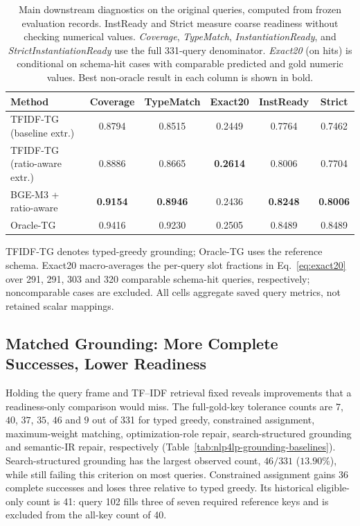 \documentclass[pdflatex,sn-basic,Numbered]{sn-jnl}
\begin{document}
\begin{table}[t]
  \centering
  \caption{Main downstream diagnostics on the original queries, computed from frozen evaluation records. InstReady and Strict measure coarse readiness without checking numerical values. \textit{Coverage}, \textit{TypeMatch}, \textit{InstantiationReady}, and \textit{StrictInstantiationReady} use the full 331-query denominator. \textit{Exact20} (on hits) is conditional on schema-hit cases with comparable predicted and gold numeric values. Best non-oracle result in each column is shown in bold.}
  \label{tab:nlp4lp-downstream-main}
  \small
  \setlength{\tabcolsep}{3.2pt}
  \renewcommand{\arraystretch}{1.12}
  \begin{tabular}{@{}lccccc@{}}
    \toprule
    Method & Coverage & TypeMatch & Exact20 & InstReady & Strict \\
    \midrule
TFIDF-TG (baseline extr.) & 0.8794 & 0.8515 & 0.2449 & 0.7764 & 0.7462 \\
TFIDF-TG (ratio-aware extr.) & 0.8886 & 0.8665 & \textbf{0.2614} & 0.8006 & 0.7704 \\
BGE-M3 + ratio-aware & \textbf{0.9154} & \textbf{0.8946} & 0.2436 & \textbf{0.8248} & \textbf{0.8006} \\
Oracle-TG & 0.9416 & 0.9230 & 0.2505 & 0.8489 & 0.8489 \\
    \bottomrule
  \end{tabular}

  \vspace{2mm}
  \raggedright
  \footnotesize
  TFIDF-TG denotes typed-greedy grounding; Oracle-TG uses the reference schema. Exact20 macro-averages the per-query slot fractions in Eq.~\eqref{eq:exact20} over 291, 291, 303 and 320 comparable schema-hit queries, respectively; noncomparable cases are excluded. All cells aggregate saved query metrics, not retained scalar mappings.
\end{table}
\subsection{Matched Grounding: More Complete Successes, Lower Readiness}
\label{subsec:exp_grounding_baselines}
Holding the query frame and TF--IDF retrieval fixed reveals improvements that a readiness-only comparison would miss. The full-gold-key tolerance counts are $7$, $40$, $37$, $35$, $46$ and $9$ out of 331 for typed greedy, constrained assignment, maximum-weight matching, optimization-role repair, search-structured grounding and semantic-IR repair, respectively (Table~\ref{tab:nlp4lp-grounding-baselines}). Search-structured grounding has the largest observed count, $46/331$ ($13.90\%$), while still failing this criterion on most queries. Constrained assignment gains 36 complete successes and loses three relative to typed greedy. Its historical eligible-only count is 41: query 102 fills three of seven required reference keys and is excluded from the all-key count of 40.
\end{document}
